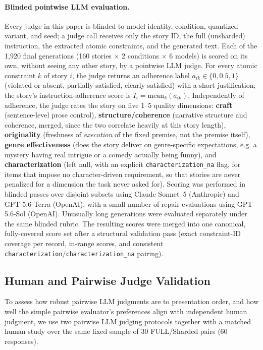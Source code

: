 \paragraph{Blinded pointwise LLM evaluation.} Every judge in this paper is blinded to model identity, condition, quantized variant, and seed; a judge call receives only the story ID, the full (unsharded) instruction, the extracted atomic constraints, and the generated text. Each of the 1{,}920 final generations (160 stories $\times$ 2 conditions $\times$ 6 models) is scored on its own, without seeing any other story, by a pointwise LLM judge. For every atomic constraint $k$ of story $i$, the judge returns an adherence label $a_{ik} \in \{0, 0.5, 1\}$ (violated or absent, partially satisfied, clearly satisfied) with a short justification; the story's instruction-adherence score is $I_i = \mathrm{mean}_k(a_{ik})$. Independently of adherence, the judge rates the story on five 1--5 quality dimensions: \textbf{craft} (sentence-level prose control), \textbf{structure/coherence} (narrative structure and coherence, merged, since the two correlate heavily at this story length), \textbf{originality} (freshness of \emph{execution} of the fixed premise, not the premise itself), \textbf{genre effectiveness} (does the story deliver on genre-specific expectations, e.g. a mystery having real intrigue or a comedy actually being funny), and \textbf{characterization} (left null, with an explicit \texttt{characterization\_na} flag, for items that impose no character-driven requirement, so that stories are never penalized for a dimension the task never asked for). Scoring was performed in blinded passes over disjoint subsets using Claude Sonnet~5 (Anthropic) and GPT-5.6-Terra (OpenAI), with a small number of repair evaluations using GPT-5.6-Sol (OpenAI). Unusually long generations were evaluated separately under the same blinded rubric. The resulting scores were merged into one canonical, fully-covered score set after a structural validation pass (exact constraint-ID coverage per record, in-range scores, and consistent \texttt{characterization}/\texttt{characterization\_na} pairing).

\subsection{Human and Pairwise Judge Validation}
\label{sec:human_eval}

To assess how robust pairwise LLM judgments are to presentation order, and how well the simple pairwise evaluator's preferences align with independent human judgment, we use two pairwise LLM judging protocols together with a matched human study over the same fixed sample of 30 FULL/Sharded pairs (60 responses).


